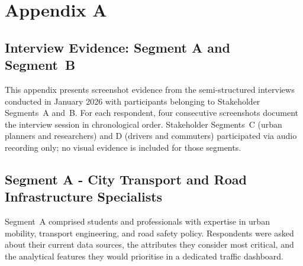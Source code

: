 \documentclass[12pt,a4paper]{report}
\begin{document}

\appendix


\chapter*{Appendix A}

\section*{Interview Evidence: Segment A and Segment~B}
\label{app:interviews}

This appendix presents screenshot evidence from the semi-structured interviews
conducted in January 2026 with participants belonging to Stakeholder Segments~A
and~B. For each respondent, four consecutive screenshots document the interview
session in chronological order. Stakeholder Segments~C (urban planners and
researchers) and D (drivers and commuters) participated via audio recording only;
no visual evidence is included for those segments.


\section*{Segment A - City Transport and Road Infrastructure Specialists}

Segment~A comprised students and professionals with expertise in urban mobility,
transport engineering, and road safety policy. Respondents were asked about their
current data sources, the attributes they consider most critical, and the analytical
features they would prioritise in a dedicated traffic dashboard.

\end{document}
